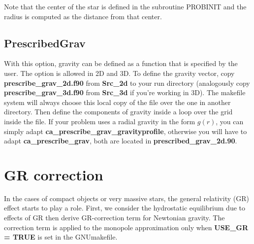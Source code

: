 \begin{itemize}
Note that the center of the star is defined in the subroutine PROBINIT and the radius
is computed as the distance from that center.

\subsection{PrescribedGrav}


With this option, gravity can be defined as a function that
is specified by the user.  The option is allowed in 2D and 3D.  To define the gravity
vector, copy {\bf prescribe\_grav\_2d.f90} from {\bf Src\_2d} to your run directory
(analogously copy {\bf prescribe\_grav\_3d.f90} from {\bf Src\_3d} if you're working in 3D).
The makefile system will always choose this local copy of the file over the one in another directory.
Then define the components of gravity inside a loop over the grid inside the file.
If your problem uses a radial gravity in the form $g(r)$, you can simply adapt 
{\bf ca\_prescribe\_grav\_gravityprofile}, otherwise you will have to adapt 
{\bf ca\_prescribe\_grav}, both are located in {\bf prescribed\_grav\_2d.90}.
\end{itemize}

\section{GR correction}


In the cases of compact objects or very massive stars, the general relativity 
(GR) effect starts to play a role. First, we consider the hydrostatic equilibrium 
due to effects of GR then derive GR-correction term for Newtonian gravity. 
The correction term is applied to the monopole approximation only when 
{\bf USE\_GR  = TRUE} is set in the GNUmakefile. 

